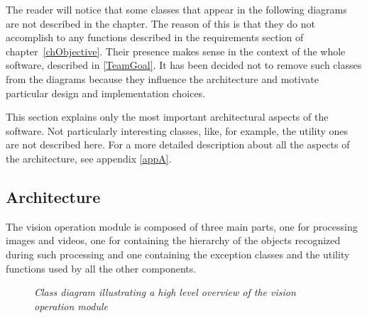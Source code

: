 	The reader will notice that some classes that appear in the following diagrams are not described in the chapter. The reason of this is that they do not accomplish to any functions described in the requirements section of \mbox{chapter \ref{chObjective}}. Their presence makes sense in the context of the whole software, described in \ref{TeamGoal}. It has been decided not to remove such classes from the diagrams because they influence the architecture and motivate particular design and implementation choices.

	This section explains only the most important architectural aspects of the software. 
	Not particularly interesting classes, like, for example, the utility ones are not described here.
	For a more detailed description about all the aspects of the architecture, see appendix \ref{appA}.

		\subsection{Architecture}\label{visOpModArch}
		The vision operation module is composed of three main parts, one for processing images and videos, one for containing the hierarchy of the objects recognized during such processing and one containing the exception classes and the utility functions used by all the other components.

		\begin{figure}[h]
		  \begin{center} 
		  \end{center} 
		  \caption{\textit{Class diagram illustrating a high level overview of the vision operation module}}  
		  \label{fig:classOverview}
	 	\end{figure}

